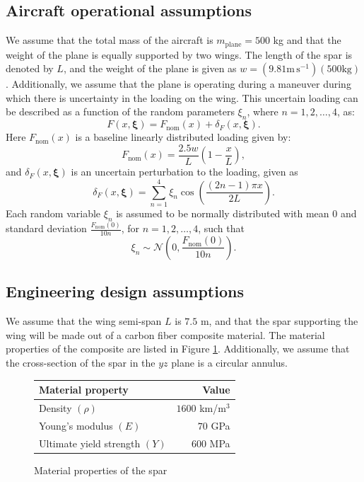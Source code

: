 \documentclass[10pt]{article}
\newcommand{\bs}[1] {\boldsymbol{#1}}
\begin{document}
\subsection{Aircraft operational assumptions}

We assume that the total mass of the aircraft is
$m_{\text{plane}} = 500$ kg and that the weight of the
plane is equally supported by two wings. The length
of the spar is denoted by $L$, and the weight of the
plane is given as
$w = (9.81 \text{m} \, \text{s}^{-1}) (500 \text{kg})$.
Additionally, we assume that the plane is operating
during a maneuver during which there is uncertainty in
the loading on the wing. This uncertain loading can be
described as a function of the random parameters $\xi_n$,
where $n=1,2, \dots, 4$, as:
%
\begin{equation}
F(x, \bs{\xi}) = F_{\text{nom}}(x) + \delta_F(x, \bs{\xi}).
\label{eq:pert_force}
\end{equation}
%
Here $F_{\text{nom}}(x)$ is a baseline linearly
distributed loading given by:
%
\begin{equation}
F_{\text{nom}}(x) = \frac{2.5 w}{L}(1 - \frac{x}{L}),
\end{equation}
%
and $\delta_F(x, \bs{\xi})$ is an uncertain perturbation to
the loading, given as
%
\begin{equation}
\delta_F(x, \bs{\xi}) = \sum_{n=1}^{4} \xi_n
\cos \left( \frac{(2n-1) \pi x}{2L} \right).
\end{equation}
%
Each random variable $\xi_n$ is assumed to be
normally distributed with mean $0$ and standard deviation
$\frac{F_\text{nom}(0)}{10n}$, for $n=1,2,\dots,4$, such
that
%
\begin{equation}
\xi_n \sim
\mathcal{N} \left( 0, \frac{F_\text{nom}(0)}{10n} \right).
\end{equation}
%

\subsection{Engineering design assumptions}

We assume that the wing semi-span $L$ is $7.5$ m, and that
the spar supporting the wing will be made out of a carbon
fiber composite material. The material properties of the
composite are listed in Figure \ref{fig:materials}.
Additionally, we assume that the cross-section of the
spar in the $yz$ plane is a circular annulus.

\begin{figure}[hbt]
\centering
\begin{tabular}{ | l | r  |}
\hline
Material property & Value \\ \hline
Density $(\rho)$ & $1600$ km/m$^3$ \\ \hline
Young's modulus $(E)$ & $70$ GPa \\ \hline
Ultimate yield strength $(Y)$ & $600$ MPa \\ \hline
\end{tabular}
\caption{Material properties of the spar}
\label{fig:materials}
\end{figure}
\end{document}
